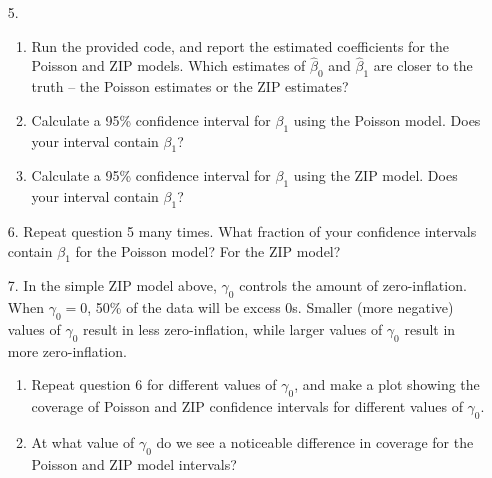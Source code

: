 \documentclass[11pt]{article}
\begin{document}
\begin{enumerate}
\item[5.] 
\begin{enumerate}
\item Run the provided code, and report the estimated coefficients for the Poisson and ZIP models. Which estimates of $\widehat{\beta}_0$ and $\widehat{\beta}_1$ are closer to the truth -- the Poisson estimates or the ZIP estimates?
\item Calculate a 95\% confidence interval for $\beta_1$ using the Poisson model. Does your interval contain $\beta_1$?
\item Calculate a 95\% confidence interval for $\beta_1$ using the ZIP model. Does your interval contain $\beta_1$?
\end{enumerate}

\item[6.] Repeat question 5 many times. What fraction of your confidence intervals contain $\beta_1$ for the Poisson model? For the ZIP model?

\item[7.] In the simple ZIP model above, $\gamma_0$ controls the amount of zero-inflation. When $\gamma_0 = 0$, 50\% of the data will be excess 0s. Smaller (more negative) values of $\gamma_0$ result in less zero-inflation, while larger values of $\gamma_0$ result in more zero-inflation.

\begin{enumerate}
\item Repeat question 6 for different values of $\gamma_0$, and make a plot showing the coverage of Poisson and ZIP confidence intervals for different values of $\gamma_0$.

\item At what value of $\gamma_0$ do we see a noticeable difference in coverage for the Poisson and ZIP model intervals?
\end{enumerate}
\end{enumerate}
\end{document}
